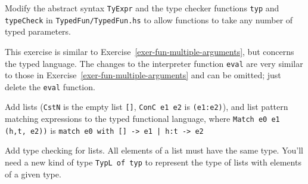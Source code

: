 \documentclass[a4paper]{article}
\begin{document}
\begin{exercise}\label{exer-fun-multiple-arguments-typed} 
  Modify the abstract syntax \texttt{TyExpr} and the type checker
  functions \texttt{typ} and \texttt{typeCheck} in
  \texttt{TypedFun/TypedFun.hs} to allow functions to take any number
  of typed parameters.  
  
  This exercise is similar to
  Exercise~\ref{exer-fun-multiple-arguments}, but concerns the typed
  language.  The changes to the interpreter function \texttt{eval} are
  very similar to those in Exercise~\ref{exer-fun-multiple-arguments}
  and can be omitted; just delete the \texttt{eval} function.\\
  

\end{exercise}


\begin{exercise}
  Add lists (\texttt{CstN} is the empty list \texttt{[]},
  \texttt{ConC e1 e2} is \texttt{(e1:e2)}), and list pattern matching
  expressions to the typed functional language, where
  \texttt{Match e0 e1 (h,t, e2))} is \texttt{match e0 with [] -> e1
    | h:t -> e2}\\


\end{exercise}

\begin{exercise}
  Add type checking for lists.  All elements of a list must have the
  same type.  You'll need a new kind of type \texttt{TypL of typ} to
  represent the type of lists with elements of a given type.\\

\end{exercise}
\end{document}
